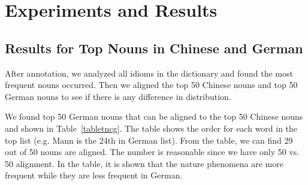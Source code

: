 \section{Experiments and Results}\label{nouns}

\subsection{Results for Top Nouns in Chinese and German}\label{firstresult}
After annotation, we analyzed all idioms in the dictionary and found the most frequent nouns occurred. Then we aligned the top 50 Chinese nouns and top 50 German nouns to see if there is any difference in distribution. 

We found top 50 German nouns that can be aligned to the top 50 Chinese nouns and shown in Table~\ref{tabletncg}. The table shows the order for each word in the top list (e.g. Mann is the 24th in German list). From the table, we can find 29 out of 50 nouns are aligned. The number is reasonable since we have only 50 vs. 50 alignment. In the table, it is shown that the nature phenomena are more frequent while they are less frequent in German. 

